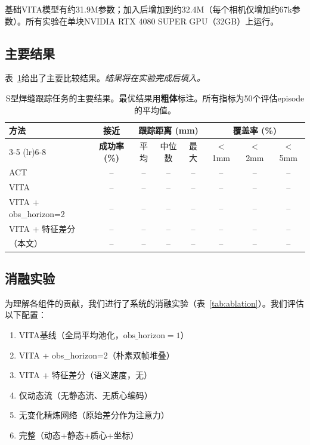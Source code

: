 基础VITA模型有约31.9M参数；加入\fasa{}后增加到约32.4M（每个相机仅增加约67k参数）。所有实验在单块NVIDIA RTX 4080 SUPER GPU（32GB）上运行。

\subsection{主要结果}
\label{sec:main_results}

表~\ref{tab:main_results}给出了主要比较结果。\textit{结果将在实验完成后填入。}

\begin{table}[t]
\centering
\caption{S型焊缝跟踪任务的主要结果。最优结果用\textbf{粗体}标注。所有指标为50个评估episode的平均值。}
\label{tab:main_results}
\begin{tabular}{lccccccc}
\toprule
\multirow{2}{*}{\textbf{方法}} & \textbf{接近} & \multicolumn{3}{c}{\textbf{跟踪距离 (mm)}} & \multicolumn{3}{c}{\textbf{覆盖率 (\%)}} \\
\cmidrule(lr){3-5} \cmidrule(lr){6-8}
 & \textbf{成功率 (\%)} & 平均 & 中位数 & 最大 & $<$1mm & $<$2mm & $<$5mm \\
\midrule
ACT~\cite{zhao2023act}            & -- & -- & -- & -- & -- & -- & -- \\
VITA~\cite{gao2026vita}           & -- & -- & -- & -- & -- & -- & -- \\
VITA + obs\_horizon=2             & -- & -- & -- & -- & -- & -- & -- \\
VITA + 特征差分            & -- & -- & -- & -- & -- & -- & -- \\
\midrule
\method{}（本文）                  & -- & -- & -- & -- & -- & -- & -- \\
\bottomrule
\end{tabular}
\end{table}

\subsection{消融实验}
\label{sec:ablation}

为理解\fasa{}各组件的贡献，我们进行了系统的消融实验（表~\ref{tab:ablation}）。我们评估以下配置：

\begin{enumerate}[label=(\alph*),leftmargin=*,itemsep=1pt]
    \item VITA基线（全局平均池化，$\text{obs\_horizon}=1$）
    \item VITA + obs\_horizon=2（朴素双帧堆叠）
    \item VITA + 特征差分（语义速度，无\fasa{}）
    \item \fasa{}仅动态流（无静态流、无质心编码）
    \item \fasa{}无变化精炼网络（原始差分作为注意力）
    \item 完整\fasa{}（动态+静态+质心+坐标）
\end{enumerate}


